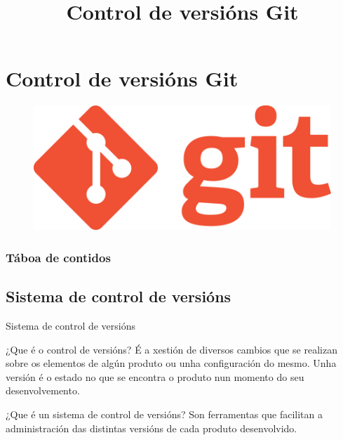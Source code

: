 
\title[Git e GitHub]{Control de versións Git}
\author[Fran Rúa e Breixo Camiña]{}

\section{Control de versións Git}
\label{sec:Git}

\begin{frame}
  \titlepage
  \begin{figure}[H]
    \centering
    \includegraphics[width=0.5\linewidth]{./img/logo-git}
    \label{fig:logo-git}
  \end{figure}
\end{frame}

\begin{frame}
  \frametitle{Táboa de contidos}
  \tableofcontents[currentsection]
\end{frame}

\subsection{Sistema de control de versións}
\label{subsec:vcs}
\begin{frame}{Sistema de control de versións}
  \begin{block}{¿Que é o control de versións?}
    É a xestión de diversos cambios que se realizan sobre os elementos de algún produto ou unha configuración do mesmo. Unha versión é o estado no que se encontra o produto nun momento do seu desenvolvemento.
  \end{block}
  \begin{block}{¿Que é un sistema de control de versións?}
    Son ferramentas que facilitan a administración das distintas versións de cada produto desenvolvido.
  \end{block}
\end{frame}

